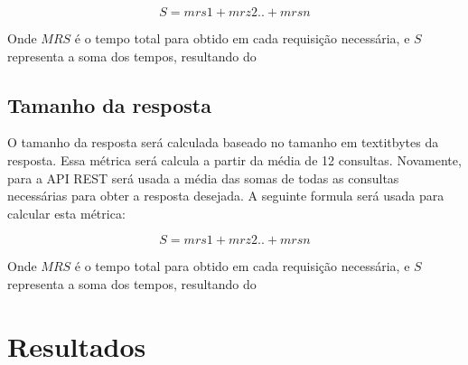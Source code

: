 $$S=mrs1+mrz2..+mrsn$$

Onde $MRS$ é o tempo total para obtido em cada requisição necessária, e $S$ representa a soma dos tempos, resultando do 

\subsection*{Tamanho da resposta}

O tamanho da resposta será calculada baseado no tamanho em textit{bytes} da resposta. Essa métrica será calcula a partir da média de 12 consultas. Novamente, para a API REST será usada a média das somas de todas as consultas necessárias para obter a resposta desejada. A seguinte formula será usada para calcular esta métrica: 

$$S=mrs1+mrz2..+mrsn$$

Onde $MRS$ é o tempo total para obtido em cada requisição necessária, e $S$ representa a soma dos tempos, resultando do 



\section{Resultados} \label{sec:resultados}
